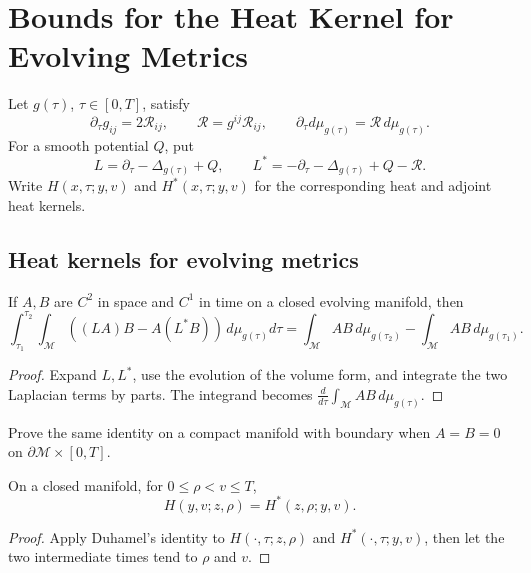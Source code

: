 \chapter[26]{Bounds for the Heat Kernel for Evolving Metrics}
\label{ch:chow-iii-heat-kernel-bounds-evolving-metrics}

Let \(g(\tau)\), \(\tau\in[0,T]\), satisfy
\[
 \partial_\tau g_{ij}=2\mathcal R_{ij},\qquad
 \mathcal R=g^{ij}\mathcal R_{ij},\qquad
 \partial_\tau d\mu_{g(\tau)}=\mathcal R\,d\mu_{g(\tau)}.
\]
For a smooth potential \(Q\), put
\[
 L=\partial_\tau-\Delta_{g(\tau)}+Q,
 \qquad L^*=-\partial_\tau-\Delta_{g(\tau)}+Q-\mathcal R.
\]
Write \(H(x,\tau;y,v)\) and \(H^*(x,\tau;y,v)\) for the corresponding
heat and adjoint heat kernels.

\section{Heat kernels for evolving metrics}

\begin{lemma}
\label{lem:chow-iii-duhamel-evolving-closed}
If \(A,B\) are \(C^2\) in space and \(C^1\) in time on a closed
evolving manifold, then
\[
 \int_{\tau_1}^{\tau_2}\!\int_{\mathcal M}
 ((LA)B-A(L^*B))\,d\mu_{g(\tau)}d\tau
 =\int_{\mathcal M}AB\,d\mu_{g(\tau_2)}
  -\int_{\mathcal M}AB\,d\mu_{g(\tau_1)}.
\]
\end{lemma}
\begin{proof}
\sketch Expand \(L,L^*\), use the evolution of the volume form, and integrate the
two Laplacian terms by parts.  The integrand becomes
\(\frac d{d\tau}\int_{\mathcal M}AB\,d\mu_{g(\tau)}\).
\end{proof}

\begin{claim}
\label{clm:chow-iii-duhamel-dirichlet-exercise}
Prove the same identity on a compact manifold with boundary when
\(A=B=0\) on \(\partial\mathcal M\times[0,T]\).
\end{claim}

\begin{lemma}
\label{lem:chow-iii-heat-adjoint-kernel-symmetry-closed}
On a closed manifold, for \(0\le \rho<v\le T\),
\[
 H(y,v;z,\rho)=H^*(z,\rho;y,v).
\]
\end{lemma}
\begin{proof}
\sketch Apply Duhamel's identity to \(H(\cdot,\tau;z,\rho)\) and
\(H^*(\cdot,\tau;y,v)\), then let the two intermediate times tend to
\(\rho\) and \(v\).
\end{proof}

